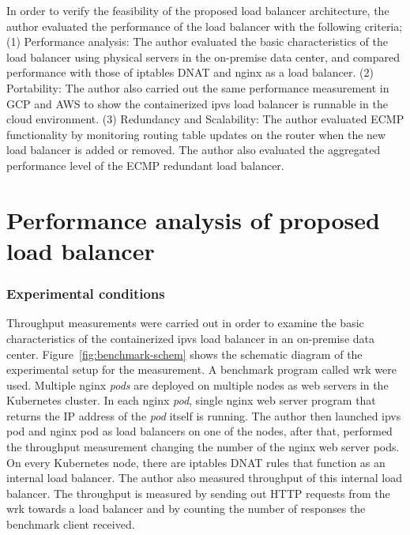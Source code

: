 
In order to verify the feasibility of the proposed load balancer architecture, the author evaluated the performance of the load balancer with the following criteria;
(1) Performance analysis:
The author evaluated the basic characteristics of the load balancer using physical servers in the on-premise data center, and compared performance with those of iptables DNAT and nginx as a load balancer.
(2) Portability:
The author also carried out the same performance measurement in GCP and AWS to show the containerized ipvs load balancer is runnable in the cloud environment.
(3) Redundancy and Scalability:
The author evaluated ECMP functionality by monitoring routing table updates on the router when the new load balancer is added or removed.
The author also evaluated the aggregated performance level of the ECMP redundant load balancer.

\section{Performance analysis of proposed load balancer}

\subsubsection{Experimental conditions}

Throughput measurements were carried out in order to examine the basic characteristics of the containerized ipvs load balancer in an on-premise data center.
Figure~\ref{fig:benchmark-schem} shows the schematic diagram of the experimental setup for the measurement.
A benchmark program called wrk\cite{Glozer2016} were used.
Multiple nginx {\em pods} are deployed on multiple nodes as web servers in the Kubernetes cluster.
In each nginx {\em pod}, single nginx web server program that returns the IP address of the {\em pod} itself is running.
The author then launched ipvs pod and nginx pod as load balancers on one of the nodes, after that, performed the throughput measurement changing the number of the nginx web server pods.
On every Kubernetes node, there are iptables DNAT rules that function as an internal load balancer.
The author also measured throughput of this internal load balancer.
The throughput is measured by sending out HTTP requests from the wrk towards a load balancer and by counting the number of responses the benchmark client received.

